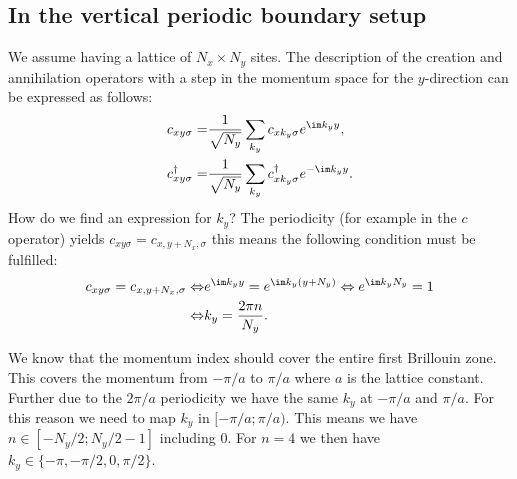\documentclass[../main.tex]{subfile}
\begin{document}
\subsection{In the vertical periodic boundary setup}\label{sec:Vertical_Fourier}
We assume having a lattice of $N_x\times N_y$ sites.
The description of the creation and annihilation operators with a step in the momentum space for the $y$-direction can be expressed as follows:
\begin{align}
    c_{xy\sigma} =& \frac{1}{\sqrt{N_y}} \sum_{k_y} c_{x k_y\sigma} e^{\im k_y y}, \label{eq:C_Foruier}\\
    c^{\dagger}_{xy\sigma} =& \frac{1}{\sqrt{N_y}} \sum_{k_y} c^{\dagger}_{x k_y\sigma} e^{-\im k_y y}.\label{eq:C_dagg_Foruier}
\end{align}
How do we find an expression for $k_y$? The periodicity (for example in the $c$ operator) yields 
$c_{xy\sigma} = c_{x,y+N_x,\sigma}$ this means the following condition must be fulfilled:
\begin{align*}
    c_{xy\sigma} = c_{x,y+N_x,\sigma} \Leftrightarrow &e^{\im k_y y} = e^{\im k_y (y+N_y)} \Leftrightarrow e^{\im k_y N_y} = 1\\
    \Leftrightarrow &k_y = \frac{2\pi n}{N_y}.
\end{align*}

We know that the momentum index should cover the entire first Brillouin zone. This covers the momentum from $-\pi/a$ to $\pi/a$ 
where $a$ is the lattice constant. Further due to the $2\pi/a$ periodicity we have the same $k_y$ at $-\pi/a$ and $\pi/a$.
For this reason we need to map $k_y $ in $[-\pi/a ;\pi/a)$.
This means we have $n\in \left[-N_y/2  ; N_y/2-1\right]$ including $0$. For $n=4$ we then have $k_y\in\{ -\pi, -\pi/2, 0,  \pi/2\}$. \\
\end{document}
